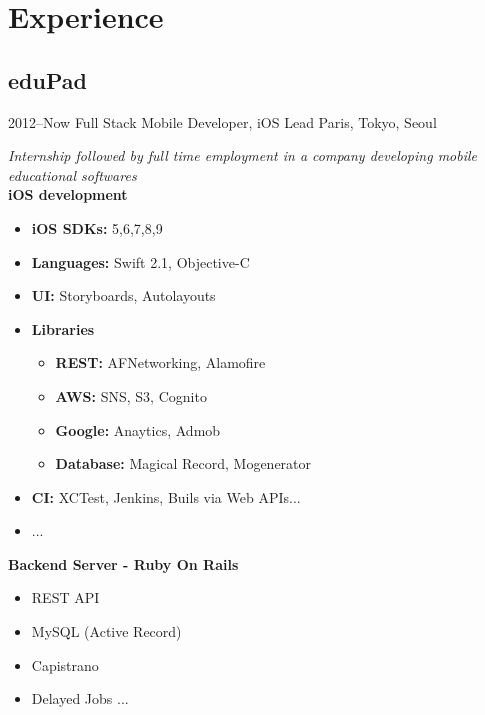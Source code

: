 \documentclass[]{template/friggeri-cv} %
\begin{document}

\section{Experience}

\subsection{eduPad}
\begin{entrylist}


\entry
{2012--Now}
{Full Stack Mobile Developer, iOS Lead}
{Paris, Tokyo, Seoul}
{\emph{Internship followed by full time employment in a company developing mobile educational softwares}\\
\textbf{iOS development} 
\begin{itemize}
\item \textbf{iOS SDKs:} 5,6,7,8,9
\item \textbf{Languages:} Swift 2.1, Objective-C
\item \textbf{UI:} Storyboards, Autolayouts
\item \textbf{Libraries}
\begin{itemize}
\item \textbf{REST:} AFNetworking, Alamofire
\item \textbf{AWS:} SNS, S3, Cognito
\item \textbf{Google:} Anaytics, Admob
\item \textbf{Database:} Magical Record, Mogenerator
\end{itemize}
\item \textbf{CI:} XCTest, Jenkins, Buils via Web APIs...
\item ...
\end{itemize}
\textbf{Backend Server - Ruby On Rails} 
\begin{itemize}
\item REST API
\item MySQL (Active Record)
\item Capistrano
\item Delayed Jobs ...
\end{itemize}


}
\end{entrylist}
\end{document}
